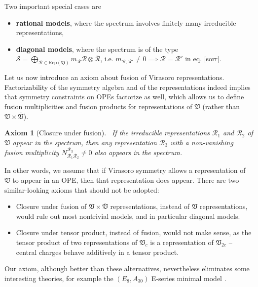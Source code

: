 \documentclass[12pt, a4paper, notitlepage, twoside]{report}
\numberwithin{equation}{section}
\theoremstyle{break}
\newtheorem{hyp}{Axiom}[chapter]
\begin{document}
Two important special cases are
\begin{itemize}
\item \textbf{\boldmath rational models}, where the spectrum involves finitely many irreducible representations,
 \item \textbf{\boldmath diagonal models}, where the spectrum is of the type $\mathcal{S}=\bigoplus_{\mathcal{R}\in \text{Rep}(\mathfrak{V})} m_\mathcal{R} \mathcal{R}\otimes \bar{\mathcal{R}}$, i.e. $m_{\mathcal{R},\mathcal{R}'}\neq 0 \implies \mathcal{R}=\mathcal{R}'$ in eq. \eqref{sorr}.
\end{itemize}
Let us now introduce an axiom about fusion of Virasoro representations. Factorizability of the symmetry algebra and of the representations indeed implies that symmetry constraints on OPEs factorize as well, which allows us to define fusion multiplicities and fusion products for representations of $\mathfrak{V}$ (rather than $\mathfrak{V}\times \overline{\mathfrak{V}}$). 

\begin{hyp}[Closure under fusion]
~\label{ax:cuf}
If the irreducible representations $\mathcal{R}_1$ and $\mathcal{R}_2$ of $\mathfrak{V}$ appear in the spectrum, then any representation $\mathcal{R}_3$ with a non-vanishing fusion multiplicity $N_{\mathcal{R}_1\mathcal{R}_2}^{\mathcal{R}_3}\neq 0$ also appears in the spectrum. 
\end{hyp} 
\noindent
In other words, we assume that if Virasoro symmetry allows a representation of $\mathfrak{V}$ to appear in an OPE, then that representation does appear.
There are two similar-looking axioms that should not be adopted:
\begin{itemize}
 \item Closure under fusion of $\mathfrak{V}\times \overline{\mathfrak{V}}$ representations, instead of $\mathfrak{V}$ representations, would rule out most nontrivial models, and in particular diagonal models. 
\item Closure under tensor product, instead of fusion, would not make sense, as the tensor product of two representations of $\mathfrak{V}_c$ is a representation of $\mathfrak{V}_{2c}$ -- central charges behave additively in a tensor product. 
\end{itemize}
Our axiom, although better than these alternatives, nevertheless eliminates some interesting theories, for example the $(E_8,A_{30})$ E-series minimal model \cite{fms97}.
\end{document}
